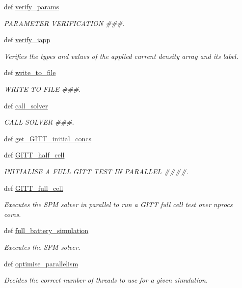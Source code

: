 \begin{DoxyCompactItemize}
def \hyperlink{namespaceuser__input__mod_a155b516c3ff05c1003e11caef128738f}{verify\-\_\-params}
\begin{DoxyCompactList}\small\item\em P\-A\-R\-A\-M\-E\-T\-E\-R V\-E\-R\-I\-F\-I\-C\-A\-T\-I\-O\-N \#\#\#. \end{DoxyCompactList}\item 
def \hyperlink{namespaceuser__input__mod_aa2382852ed7b2a4b8d19529c4ab0ac7e}{verify\-\_\-iapp}
\begin{DoxyCompactList}\small\item\em Verifies the types and values of the applied current density array and its label. \end{DoxyCompactList}\item 
def \hyperlink{namespaceuser__input__mod_a23ddc1955874f5e5e2639522e3f4d276}{write\-\_\-to\-\_\-file}
\begin{DoxyCompactList}\small\item\em W\-R\-I\-T\-E T\-O F\-I\-L\-E \#\#\#. \end{DoxyCompactList}\item 
def \hyperlink{namespaceuser__input__mod_a839dc51641b24f79bf86be76eb2d6fbd}{call\-\_\-solver}
\begin{DoxyCompactList}\small\item\em C\-A\-L\-L S\-O\-L\-V\-E\-R \#\#\#. \end{DoxyCompactList}\item 
def \hyperlink{namespaceuser__input__mod_a4118861403235a2f22445738a0914fa5}{get\-\_\-\-G\-I\-T\-T\-\_\-initial\-\_\-concs}
\item 
def \hyperlink{namespaceuser__input__mod_acf625a02cf11d1ac11c4230e21f9987b}{G\-I\-T\-T\-\_\-half\-\_\-cell}
\begin{DoxyCompactList}\small\item\em I\-N\-I\-T\-I\-A\-L\-I\-S\-E A F\-U\-L\-L G\-I\-T\-T T\-E\-S\-T I\-N P\-A\-R\-A\-L\-L\-E\-L \#\#\#\#. \end{DoxyCompactList}\item 
def \hyperlink{namespaceuser__input__mod_a5e6e143a3b61689997f8b3036df0b5c6}{G\-I\-T\-T\-\_\-full\-\_\-cell}
\begin{DoxyCompactList}\small\item\em Executes the S\-P\-M solver in parallel to run a G\-I\-T\-T full cell test over nprocs cores. \end{DoxyCompactList}\item 
def \hyperlink{namespaceuser__input__mod_ae0adc52acc50861e6830ca5917c8a49c}{full\-\_\-battery\-\_\-simulation}
\begin{DoxyCompactList}\small\item\em Executes the S\-P\-M solver. \end{DoxyCompactList}\item 
def \hyperlink{namespaceuser__input__mod_aea01ecd06e7c99fb37057ed6ca6651ae}{optimise\-\_\-parallelism}
\begin{DoxyCompactList}\small\item\em Decides the correct number of threads to use for a given simulation. \end{DoxyCompactList}\end{DoxyCompactItemize}


